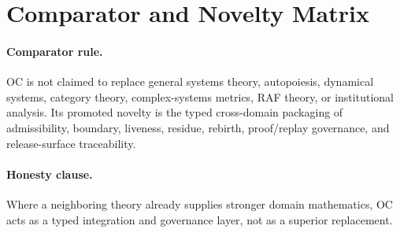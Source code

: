
\section{Comparator and Novelty Matrix}
\label{app:oc133-comparator}

\paragraph{Comparator rule.}
OC is not claimed to replace general systems theory, autopoiesis, dynamical
systems, category theory, complex-systems metrics, RAF theory, or institutional
analysis.  Its promoted novelty is the typed cross-domain packaging of
admissibility, boundary, liveness, residue, rebirth, proof/replay governance,
and release-surface traceability.

\paragraph{Honesty clause.}
Where a neighboring theory already supplies stronger domain mathematics, OC
acts as a typed integration and governance layer, not as a superior replacement.
